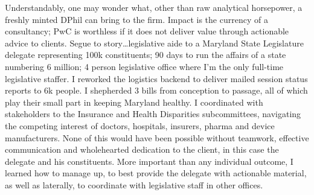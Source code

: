 \documentclass[a4paper]{../res}
\begin{document}
\begin{sloppypar}
\begin{resume}


Understandably, one may wonder what, other than raw analytical horsepower, a freshly minted DPhil can bring to the firm. Impact is the currency of a consultancy; PwC is worthless if it does not deliver value through actionable advice to clients. Segue to story\ldots legislative aide to a Maryland State Legislature delegate representing 100k constituents; 90 days to run the affairs of a state numbering 6 million; 4 person legislative office where I'm the only full-time legislative staffer. I reworked the logistics backend to deliver mailed session status reports to 6k people. I shepherded 3 bills from conception to passage, all of which play their small part in keeping Maryland healthy. I coordinated with stakeholders to the Insurance and Health Disparities subcommittees, navigating the competing interest of doctors, hospitals, insurers, pharma and device manufacturers. None of this would have been possible without teamwork, effective communication and wholehearted dedication to the client, in this case the delegate and his constituents. More important than any individual outcome, I learned how to manage up, to best provide the delegate with actionable material, as well as laterally, to coordinate with legislative staff in other offices.


\end{resume}
\end{sloppypar}
\end{document}
